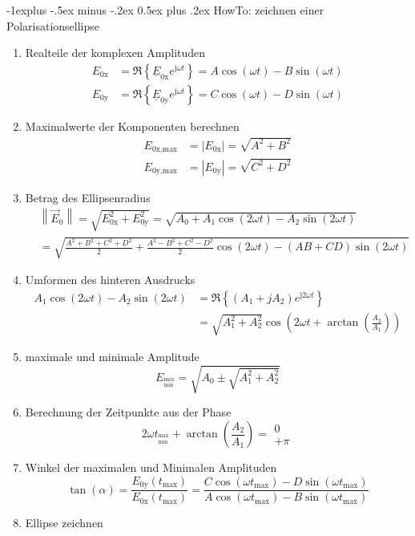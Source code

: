 \documentclass[10pt,a4paper,fleqn,landscape]{article}
\makeatletter
\renewcommand{\subsection}{\@startsection{subsection}{2}{0mm}%
                                {-1explus -.5ex minus -.2ex}%
                                {0.5ex plus .2ex}%
                                {\normalfont\normalsize\bfseries}}
\renewcommand{\c}[1]{\underline{#1}}			%
\renewcommand{\j}{{\mathrm j}}					%
\newcommand{\norm}[1]{\left\lVert#1\right\rVert}	%
\makeatother
\begin{document}
\begin{multicols}{2}
\subsection{HowTo: zeichnen einer Polarisationsellipse}
\begin{enumerate}
	\item Realteile der komplexen Amplituden
		\begin{align*}
			E_{0\text{x}}&=\Re{\left\{ \c{E}_{0\text{x}}e^{\j\omega t}\right\}} = A\cos(\omega t) - B\sin(\omega t) \\
			E_{0\text{y}}&=\Re{\left\{ \c{E}_{0\text{y}}e^{\j\omega t}\right\}} = C\cos(\omega t) - D\sin(\omega t)
		\end{align*}
	\item Maximalwerte der Komponenten berechnen
		\begin{align*}
			E_{0\text{x,max}}&=|E_{0\text{x}}|=\sqrt{A^2+B^2}\\
			E_{0\text{y,max}}&=|E_{0\text{y}}|=\sqrt{C^2+D^2}
		\end{align*}
	\item Betrag des Ellipsenradius
		\begin{align*}
			&\norm{\vec{E}_0}=\sqrt{E^2_{0\text{x}}+E^2_{0\text{y}}}=\sqrt{A_0+A_1\cos(2\omega t)-A_2\sin(2\omega t)}\\
			&=\sqrt{\frac{A^2+B^2+C^2+D^2}{2}+\frac{A^2-B^2+C^2-D^2}{2}\cos(2\omega t)-(AB+CD)\sin(2\omega t)}
		\end{align*}
	\item Umformen des hinteren Ausdrucks
		\begin{align*}
			A_1\cos(2\omega t)-A_2\sin(2\omega t)&=\Re\left\{(A_1+jA_2)e^{\j2\omega t}\right\}\\
			&=\sqrt{A_1^2+A_2^2}\cos\left(2\omega t+\arctan\left(\frac{A_2}{A_1}\right)\right)
		\end{align*}
	\item maximale und minimale Amplitude
		\begin{equation*}
			E_{^\text{max}_\text{min}}=\sqrt{A_0\pm\sqrt{A_1^2+A_2^2}}
		\end{equation*}
	\item Berechnung der Zeitpunkte aus der Phase
		\begin{equation*}
			2\omega t_{^\text{max}_\text{min}}+\arctan\left(\frac{A_2}{A_1}\right)=
			\begin{matrix}
				0\\
				+\pi
			\end{matrix}
		\end{equation*}
	\item Winkel der maximalen und Minimalen Amplituden
		\begin{equation*}
			\tan(\alpha)=\frac{E_{0\text{y}}\left(t_{\text{max}}\right)}{E_{0\text{x}}\left(t_{\text{max}}\right)}=\frac{C\cos\left(\omega t_{\text{max}}\right)-D\sin\left(\omega t_{\text{max}}\right)}{A\cos\left(\omega t_{\text{max}}\right)-B\sin\left(\omega t_{\text{max}}\right)}
		\end{equation*}
	\item Ellipse zeichnen


\end{enumerate}
\end{multicols}
\end{document}
